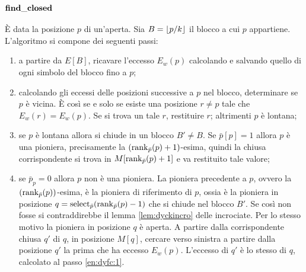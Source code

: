 \paragraph{$\mathbf{find\_closed}$} È data la posizione $p$ di un'aperta. Sia $B=\left\lfloor p/k \right\rfloor$ il blocco a cui $p$ appartiene.
L'algoritmo si compone dei seguenti passi:
\begin{enumerate}
	\item \label{en:dyfc:1} a partire da $E[B]$, ricavare l'eccesso $E_w(p)$ calcolando e salvando quello di ogni simbolo del blocco fino a $p$;
	\item calcolando gli eccessi delle posizioni successive a $p$ nel blocco, determinare se $p$ è vicina.
	      È così se e solo se esiste una posizione $r\neq p$ tale che $E_w(r)=E_w(p)$. Se si trova un tale $r$, restituire $r$; altrimenti $p$ è lontana;
	\item se $p$ è lontana allora si chiude in un blocco $B'\neq B$.
	      Se $\bar p[p]=1$ allora $p$ è una pioniera, precisamente la $(\mathrm{rank}_{\bar p}(p)+1)$-esima, quindi la chiusa corrispondente si trova in $M[\mathrm{rank}_{\bar p}(p)+1]$ e va restituito tale valore;
	\item se $\bar p_p=0$ allora $p$ non è una pioniera.
	      La pioniera precedente a $p$, ovvero la $(\mathrm{rank}_{\bar p}(p))$-esima, è la pioniera di riferimento di $p$, ossia è la pioniera in posizione $q=\mathrm{select}_{\bar p}(\mathrm{rank}_{\bar p}(p)-1)$ che si chiude nel blocco $B'$.
	      Se così non fosse si contraddirebbe il lemma \ref{lem:dyckincro} delle incrociate. Per lo stesso motivo la pioniera in posizione $q$ è aperta.
	      A partire dalla corrispondente chiusa $q'$ di $q$, in posizione $M[q]$, cercare verso sinistra a partire dalla posizione $q'$ la prima che ha eccesso $E_w(p)$.
	      L'eccesso di $q'$ è lo stesso di $q$, calcolato al passo \ref{en:dyfc:1}.
\end{enumerate}

